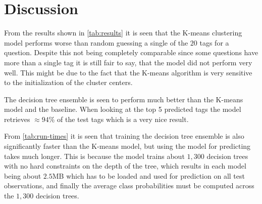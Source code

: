 
\section{Discussion}

From the results shown in \cref{tab:results} it is seen that the K-means
clustering model performs worse than random guessing a single of the $20$ tags
for a question. Despite this not being completely comparable since some questions have
more than a single tag it is still fair to say, that the model did not
perform very well. This might be due to the fact that the K-means algorithm is
very sensitive to the initialization of the cluster centers.


The decision tree ensemble is seen to perform much better than the K-means model
and the baseline. When looking at the top 5 predicted tags the model retrieves
$\approx 94\%$ of the test tags which is a very nice result.

From \cref{tab:run-times} it is seen that training the decision tree ensemble is
also significantly faster than the K-means model, but using the model for
predicting takes much longer. This is because the model trains about $1,300$
decision trees with no hard constraints on the depth of the tree, which results
in each model being about $2.5$MB which has to be loaded and used for prediction
on all test observations, and finally the average class probabilities must be
computed across the $1,300$ decision trees.
